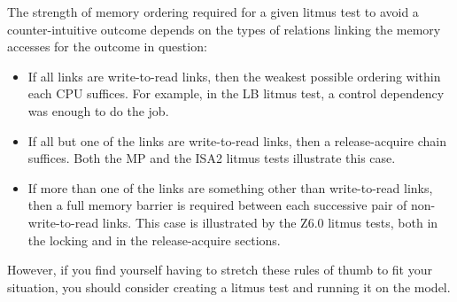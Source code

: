 The strength of memory ordering required for a given litmus test to
avoid a counter-intuitive outcome depends on the types of relations
linking the memory accesses for the outcome in question:

\begin{itemize}
\item	If all links are write-to-read links, then the weakest
	possible ordering within each CPU suffices.
	For example, in the LB litmus test, a control dependency
	was enough to do the job.

\item	If all but one of the links are write-to-read links, then a
	release-acquire chain suffices.
	Both the MP and the ISA2 litmus tests illustrate this case.

\item	If more than one of the links are something other than
	write-to-read links, then a full memory barrier is required
	between each successive pair of non-write-to-read links.
	This case is illustrated by the Z6.0 litmus tests, both in the
	locking and in the release-acquire sections.
\end{itemize}

However, if you find yourself having to stretch these rules of thumb
to fit your situation, you should consider creating a litmus test and
running it on the model.
